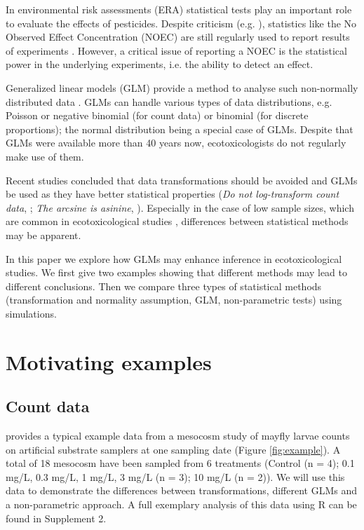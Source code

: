 \documentclass{scrartcl}
\begin{document}
In environmental risk assessments (ERA) statistical tests play an important role to evaluate the effects of pesticides. 
Despite criticism (e.g. \citealp{landis_well_2011}), statistics like the No Observed Effect Concentration (NOEC) are still regularly used to report results of experiments \citep{jager_bad_2012}.
However, a critical issue of reporting a NOEC is the statistical power in the underlying experiments, i.e. the ability to detect an effect.

Generalized linear models (GLM) provide a method to analyse such non-normally distributed data \citep{nelder_generalized_1972}.
GLMs can handle various types of data distributions, e.g. Poisson or negative binomial (for count data) or binomial (for discrete proportions); the normal distribution being a special case of GLMs.
Despite that GLMs were available more than 40 years now, ecotoxicologists do not regularly make use of them.

Recent studies concluded that data transformations should be avoided and GLMs be used as they have better statistical properties (\emph{Do not log-transform count data}, \citep{ohara_not_2010}; \emph{The arcsine is asinine}, \citep{warton_arcsine_2011}).
Especially in the case of low sample sizes, which are common in ecotoxicological studies \citep{sanderson_pesticide_2002,szocs_analysing_2015}, differences between statistical methods may be apparent. 


In this paper we explore how GLMs may enhance inference in ecotoxicological studies.
We first give two examples showing that different methods may lead to different conclusions. 
Then we compare three types of statistical methods (transformation and normality assumption, GLM, non-parametric tests) using simulations.


\section{Motivating examples}
\subsection{Count data}
\citet{brock_minimum_2015} provides a typical example data from a mesocosm study of mayfly larvae counts on artificial substrate samplers at one sampling date (Figure \ref{fig:example}). 
A total of 18 mesocosm have been sampled from 6 treatments (Control (n = 4); 0.1 mg/L, 0.3 mg/L, 1 mg/L, 3 mg/L (n = 3); 10 mg/L (n = 2)).
We will use this data to demonstrate the differences between transformations, different GLMs and a non-parametric approach.
A full exemplary analysis of this data using R \citep{r_core_team_r:_2014} can be found in Supplement 2.
\end{document}
